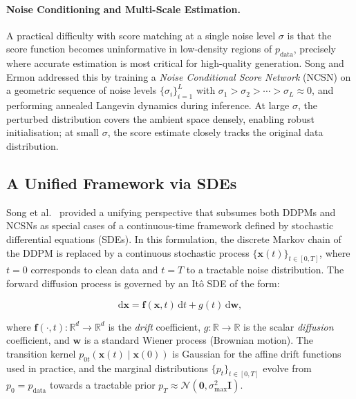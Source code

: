 \paragraph{Noise Conditioning and Multi-Scale Estimation.}
A practical difficulty with score matching at a single noise level $\sigma$ is
that the score function becomes uninformative in low-density regions of
$p_{\text{data}}$, precisely where accurate estimation is most critical for
high-quality generation. Song and Ermon \cite{song2019generative, song2020improved}
addressed this by training a \emph{Noise Conditional Score Network} (NCSN) on a
geometric sequence of noise levels
$\{\sigma_i\}_{i=1}^L$ with $\sigma_1 > \sigma_2 > \cdots > \sigma_L \approx 0$,
and performing annealed Langevin dynamics during inference. At large $\sigma$,
the perturbed distribution covers the ambient space densely, enabling robust
initialisation; at small $\sigma$, the score estimate closely tracks the
original data distribution.


\subsection{A Unified Framework via SDEs}
\label{subsec:sde}

Song et al.\ \cite{song2021scorebased} provided a unifying perspective that
subsumes both DDPMs and NCSNs as special cases of a continuous-time framework
defined by stochastic differential equations (SDEs). In this formulation, the
discrete Markov chain of the DDPM is replaced by a continuous stochastic
process $\{\mathbf{x}(t)\}_{t \in [0, T]}$, where $t = 0$ corresponds to
clean data and $t = T$ to a tractable noise distribution. The forward
diffusion process is governed by an Itô SDE of the form:

\begin{equation}
    \mathrm{d}\mathbf{x} = \mathbf{f}(\mathbf{x}, t)\,\mathrm{d}t
    + g(t)\,\mathrm{d}\mathbf{w},
    \label{eq:forward_sde}
\end{equation}

\noindent where $\mathbf{f}(\cdot, t) : \mathbb{R}^d \to \mathbb{R}^d$ is
the \emph{drift} coefficient, $g : \mathbb{R} \to \mathbb{R}$ is the scalar
\emph{diffusion} coefficient, and $\mathbf{w}$ is a standard Wiener process
(Brownian motion). The transition kernel $p_{0t}(\mathbf{x}(t) \mid \mathbf{x}(0))$
is Gaussian for the affine drift functions used in practice, and the marginal
distributions $\{p_t\}_{t \in [0,T]}$ evolve from $p_0 = p_{\text{data}}$
towards a tractable prior $p_T \approx \mathcal{N}(\mathbf{0}, \sigma^2_{\max}\mathbf{I})$.

